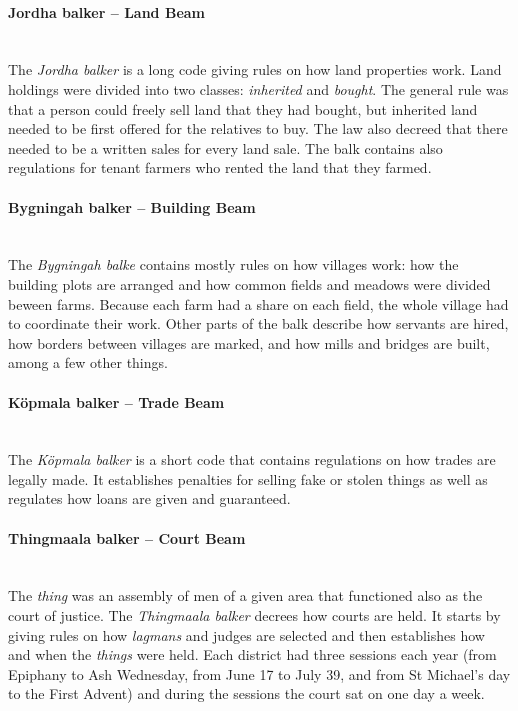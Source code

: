\documentclass[a4paper]{article}
\begin{document}
\paragraph {Jordha balker – Land Beam} \mbox{}\\

The \emph{Jordha balker} is a long code giving rules on how land
properties work. Land holdings were divided into two classes:
\emph{inherited} and \emph{bought}. The general rule was that a person
could freely sell land that they had bought, but inherited land needed
to be first offered for the relatives to buy. The law also decreed
that there needed to be a written sales for every land sale. The balk
contains also regulations for tenant farmers who rented the land that
they farmed.

\paragraph {Bygningah balker – Building Beam} \mbox{}\\

The \emph{Bygningah balke} contains mostly rules on how villages work:
how the building plots are arranged and how common fields and meadows
were divided beween farms. Because each farm had a share on each
field, the whole village had to coordinate their work. Other parts of
the balk describe how servants are hired, how borders between villages
are marked, and how mills and bridges are built, among a few other
things.

\paragraph {Köpmala balker – Trade Beam} \mbox{}\\


The \emph{Köpmala balker} is a short code that contains regulations on
how trades are legally made. It establishes penalties for selling fake
or stolen things as well as regulates how loans are given and
guaranteed. 


\paragraph {Thingmaala balker – Court Beam} \mbox{}\\

The \emph{thing} was an assembly of men of a given area that
functioned also as the court of justice. The \emph{Thingmaala balker}
decrees how courts are held. It starts by giving rules on how
\emph{lagmans} and judges are selected and then establishes how and
when the \emph{things} were held. Each district had three sessions
each year (from Epiphany to Ash Wednesday, from June 17 to July 39,
and from St Michael's day to the First Advent) and during the sessions
the court sat on one day a week.
\end{document}
